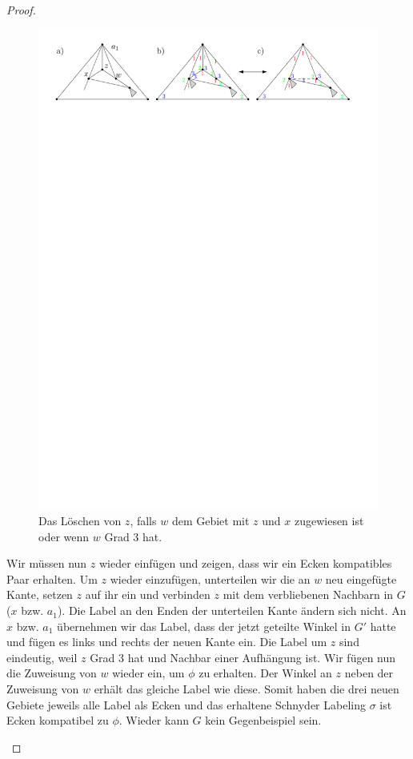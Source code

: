 \begin{proof}
\begin{description}[leftmargin =0pt, font = \rmfamily ,listparindent=\parindent,parsep=0pt]
\begin{figure}[h]
	\centering
	  \includegraphics[width=1\textwidth]{lem5_5.pdf}
    	\caption{Das Löschen von $z$, falls $w$ dem Gebiet mit $z$ und $x$ zugewiesen ist oder wenn $w$ Grad 3 hat.}
    	\label{pic_lem5_5}
\end{figure}

Wir müssen nun $z$ wieder einfügen und zeigen, dass wir ein Ecken kompatibles Paar erhalten. Um $z$ wieder einzufügen, unterteilen wir die an $w$ neu eingefügte Kante, setzen $z$ auf ihr ein und verbinden $z$ mit dem verbliebenen Nachbarn in $G$ ($x$ bzw. $a_1$). Die Label an den Enden der unterteilen Kante ändern sich nicht. An $x$ bzw. $a_1$ übernehmen wir das Label, dass der jetzt geteilte Winkel in $G'$ hatte und fügen es links und rechts der neuen Kante ein. Die Label um $z$ sind eindeutig, weil $z$ Grad 3 hat und Nachbar einer Aufhängung ist. Wir fügen nun die Zuweisung von $w$ wieder ein, um $\phi$ zu erhalten. Der Winkel an $z$ neben der Zuweisung von $w$ erhält das gleiche Label wie diese. Somit haben die drei neuen Gebiete jeweils alle Label als Ecken und das erhaltene Schnyder Labeling $\sigma$ ist Ecken kompatibel zu $\phi$. Wieder kann $G$ kein Gegenbeispiel sein.


\end{description}
\end{proof}
